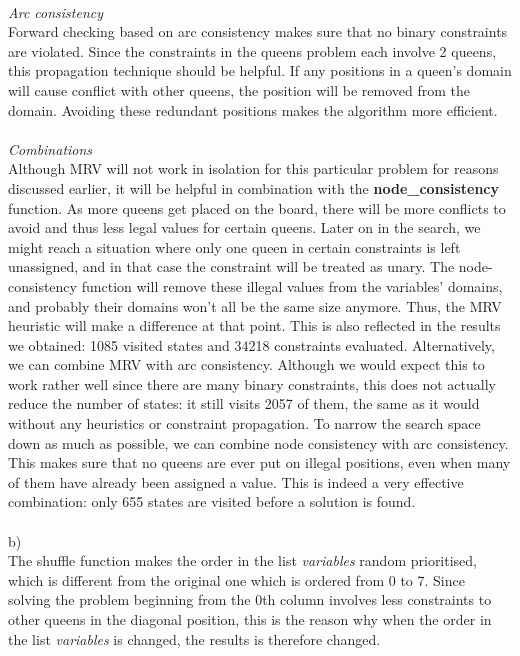 \documentclass{article}
\begin{document}
\\
\textit{Arc consistency}\\
Forward checking based on arc consistency makes sure that no binary constraints are violated. Since the constraints in the queens problem each involve 2 queens, this propagation technique should be helpful. If any positions in a queen's domain will cause conflict with other queens, the position will be removed from the domain. Avoiding these redundant positions makes the algorithm more efficient. \\
\\
\textit{Combinations}\\
Although MRV will not work in isolation for this particular problem for reasons discussed earlier, it will be helpful in combination with the \textbf{node\_consistency} function. As more queens get placed on the board, there will be more conflicts to avoid and thus less legal values for certain queens. Later on in the search, we might reach a situation where only one queen in certain constraints is left unassigned, and in that case the constraint will be treated as unary. The node-consistency function will remove these illegal values from the variables' domains, and probably their domains won't all be the same size anymore. Thus, the MRV heuristic will make a difference at that point. This is also reflected in the results we obtained: 1085 visited states and 34218 constraints evaluated. Alternatively, we can combine MRV with arc consistency. Although we would expect this to work rather well since there are many binary constraints, this does not actually reduce the number of states: it still visits 2057 of them, the same as it would without any heuristics or constraint propagation. To narrow the search space down as much as possible, we can combine node consistency with arc consistency. This makes sure that no queens are ever put on illegal positions, even when many of them have already been assigned a value. This is indeed a very effective combination: only 655 states are visited before a solution is found. \\
\\
b)
\\
The shuffle function makes the order in the list \textit{variables} random prioritised, which is different from the original one which is ordered from 0 to 7. Since solving the problem beginning from the 0th column involves less constraints to other queens in the diagonal position, this is the reason why when the order in the list \textit{variables} is changed, the results is therefore changed.
\end{document}
